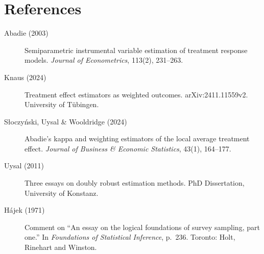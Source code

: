 \documentclass[12pt, a4paper]{article}
\theoremstyle{condstyle}
\theoremstyle{plain}
\begin{document}
\section*{References}

\begin{description}
  \item[Abadie (2003)] Semiparametric instrumental variable estimation of treatment response models.
        \textit{Journal of Econometrics}, 113(2), 231--263.

  \item[Knaus (2024)] Treatment effect estimators as weighted outcomes.
        arXiv:2411.11559v2. University of Tübingen.

  \item[Słoczy\'nski, Uysal \& Wooldridge (2024)] Abadie's kappa and weighting estimators
        of the local average treatment effect.
        \textit{Journal of Business \& Economic Statistics}, 43(1), 164--177.

  \item[Uysal (2011)] Three essays on doubly robust estimation methods.
        PhD Dissertation, University of Konstanz.

  \item[Hájek (1971)] Comment on ``An essay on the logical foundations of survey sampling, part one.''
        In \textit{Foundations of Statistical Inference}, p.~236. Toronto: Holt, Rinehart and Winston.
\end{description}
\end{document}
